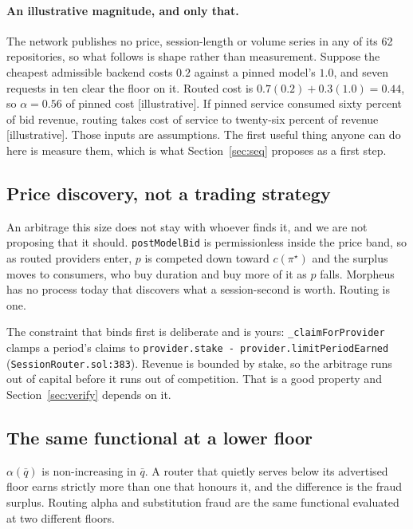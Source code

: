 \documentclass[11pt,a4paper]{article}
\newcommand{\code}[1]{\texttt{\small #1}}
\begin{document}
\paragraph{An illustrative magnitude, and only that.} The network publishes no
price, session-length or volume series in any of its 62 repositories, so what
follows is shape rather than measurement. Suppose the cheapest admissible
backend costs $0.2$ against a pinned model's $1.0$, and seven requests in ten
clear the floor on it. Routed cost is $0.7(0.2) + 0.3(1.0) = 0.44$, so
$\alpha = 0.56$ of pinned cost [illustrative]. If pinned service consumed sixty
percent of bid revenue, routing takes cost of service to twenty-six percent of
revenue [illustrative]. Those inputs are assumptions. The first useful thing anyone can do here is measure
them, which is what Section~\ref{sec:seq} proposes as a first step.

\subsection{Price discovery, not a trading strategy}

An arbitrage this size does not stay with whoever finds it, and we are not
proposing that it should. \code{postModelBid} is permissionless inside the price
band, so as routed providers enter, $p$ is competed down toward $c(\pi^\star)$
and the surplus moves to consumers, who buy duration and buy more of it as $p$
falls. Morpheus has no process today that discovers what a session-second is
worth. Routing is one.

The constraint that binds first is deliberate and is yours:
\code{\_claimForProvider} clamps a period's claims to
\code{provider.stake - provider.limitPeriodEarned}
(\code{SessionRouter.sol:383}). Revenue is bounded by stake, so the arbitrage
runs out of capital before it runs out of competition. That is a good property
and Section~\ref{sec:verify} depends on it.

\subsection{The same functional at a lower floor}
\label{sec:dual}

$\alpha(\bar q)$ is non-increasing in $\bar q$. A router that quietly serves
below its advertised floor earns strictly more than one that honours it, and the
difference is the fraud surplus. Routing alpha and substitution fraud are the
same functional evaluated at two different floors.
\end{document}
